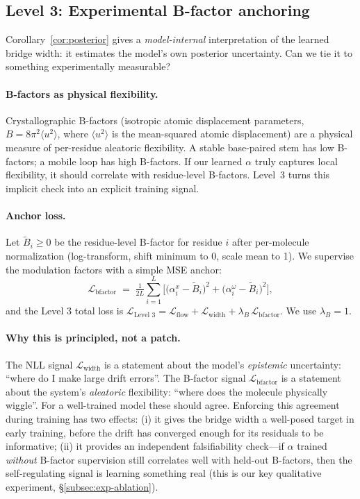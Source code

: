 \documentclass{article}
\theoremstyle{remark}
\theoremstyle{definition}
\begin{document}
\subsection{Level 3: Experimental B-factor anchoring}
\label{subsec:bfactor}

Corollary~\ref{cor:posterior} gives a \emph{model-internal} interpretation of
the learned bridge width: it estimates the model's own posterior uncertainty.
Can we tie it to something experimentally measurable?

\paragraph{B-factors as physical flexibility.}
Crystallographic B-factors (isotropic atomic displacement parameters,
$B=8\pi^2\langle u^2\rangle$, where $\langle u^2\rangle$ is the mean-squared
atomic displacement) are a physical measure of per-residue aleatoric
flexibility. A stable base-paired stem has low B-factors; a mobile loop has
high B-factors. If our learned $\alpha$ truly captures local flexibility, it
should correlate with residue-level B-factors. Level~3 turns this implicit
check into an explicit training signal.

\paragraph{Anchor loss.}
Let $\tilde B_i\geq 0$ be the residue-level B-factor for residue $i$ after
per-molecule normalization (log-transform, shift minimum to 0, scale mean to
1). We supervise the modulation factors with a simple MSE anchor:
\begin{equation}
\mathcal{L}_{\text{bfactor}}\;=\;\tfrac{1}{2L}\sum_{i=1}^L
\Big[\big(\alpha^x_i-\tilde B_i\big)^2+\big(\alpha^\omega_i-\tilde B_i\big)^2\Big],
\label{eq:bfactor-loss}
\end{equation}
and the Level 3 total loss is
$\mathcal{L}_{\text{Level 3}}=\mathcal{L}_{\text{flow}}+\mathcal{L}_{\text{width}}
+\lambda_B\,\mathcal{L}_{\text{bfactor}}$. We use $\lambda_B=1$.

\paragraph{Why this is principled, not a patch.}
The NLL signal $\mathcal{L}_{\text{width}}$ is a statement about the model's
\emph{epistemic} uncertainty: ``where do I make large drift errors''. The
B-factor signal $\mathcal{L}_{\text{bfactor}}$ is a statement about the
system's \emph{aleatoric} flexibility: ``where does the molecule physically
wiggle''. For a well-trained model these should agree. Enforcing this
agreement during training has two effects: (i) it gives the bridge width a
well-posed target in early training, before the drift has converged enough
for its residuals to be informative; (ii) it provides an independent
falsifiability check---if $\alpha$ trained \emph{without} B-factor supervision
still correlates well with held-out B-factors, then the self-regulating signal
is learning something real (this is our key qualitative experiment,
\S\ref{subsec:exp-ablation}).
\end{document}
